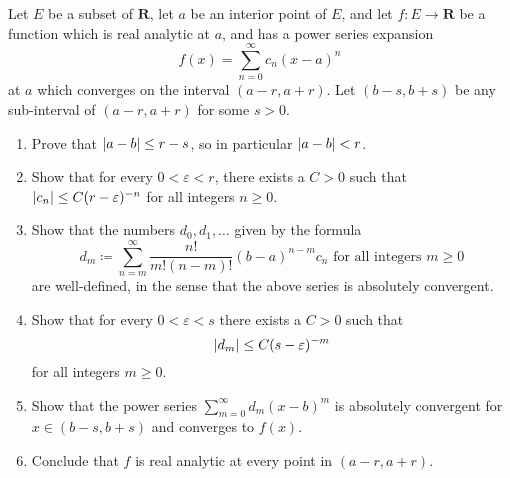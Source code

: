 \begin{exercise}\label{ex 4.2.8}
    Let \(E\) be a subset of \(\mathbf{R}\), let \(a\) be an interior point of \(E\), and let \(f : E \to \mathbf{R}\) be a function which is real analytic at \(a\), and has a power series expansion
    \[
        f(x) = \sum_{n = 0}^\infty c_n (x - a)^n
    \]
    at \(a\) which converges on the interval \((a - r, a + r)\).
    Let \((b - s, b + s)\) be any sub-interval of \((a - r, a + r)\) for some \(s > 0\).
    \begin{enumerate}
        \item Prove that \(\abs*{a - b} \leq r - s\), so in particular \(\abs*{a - b} < r\).
        \item Show that for every \(0 < \varepsilon < r\), there exists a \(C > 0\) such that \(\abs*{c_n} \leq C(r - \varepsilon)^{-n}\) for all integers \(n \geq 0\).
        \item Show that the numbers \(d_0, d_1, \dots\) given by the formula
              \[
                  d_m \coloneqq \sum_{n = m}^\infty \frac{n!}{m! (n - m)!} (b - a)^{n - m} c_n \text{ for all integers } m \geq 0
              \]
              are well-defined, in the sense that the above series is absolutely convergent.
        \item Show that for every \(0 < \varepsilon < s\) there exists a \(C > 0\) such that
              \[
                  \abs*{d_m} \leq C(s - \varepsilon)^{-m}
              \]
              for all integers \(m \geq 0\).
        \item Show that the power series \(\sum_{m = 0}^\infty d_m (x - b)^m\) is absolutely convergent for \(x \in (b - s, b + s)\) and converges to \(f(x)\).
        \item Conclude that \(f\) is real analytic at every point in \((a - r, a + r)\).
    \end{enumerate}
\end{exercise}